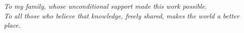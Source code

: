 
\newpage
\thispagestyle{empty}
\vspace*{\fill}
\begin{center}
  \textit{To my family, whose unconditional support made this work possible.}\\[0.8cm]
  \textit{To all those who believe that knowledge, freely shared, makes the world a better place.}
\end{center}
\vspace*{\fill}
\newpage
